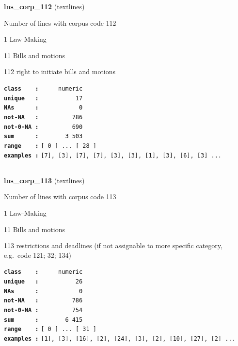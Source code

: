\documentclass[]{article}
\begin{document}
\textbf{lns\_corp\_112} (textlines)

Number of lines with corpus code 112

1 Law-Making

11 Bills and motions

112 right to initiate bills and motions

\textbf{\texttt{class\ \ \ \ :}} \texttt{~~~~~numeric}\\
\textbf{\texttt{unique\ \ \ :}} \texttt{~~~~~~~~~~17}\\
\textbf{\texttt{NAs\ \ \ \ \ \ :}} \texttt{~~~~~~~~~~~0}\\
\textbf{\texttt{not-NA\ \ \ :}} \texttt{~~~~~~~~~786}\\
\textbf{\texttt{not-0-NA\ :}} \texttt{~~~~~~~~~690}\\
\textbf{\texttt{sum\ \ \ \ \ \ :}} \texttt{~~~~~~~3~503}\\
\textbf{\texttt{range\ \ \ \ :}}
\texttt{{[}\ 0\ {]}\ ...\ {[}\ 28\ {]}}\\
\textbf{\texttt{examples\ :}}
\texttt{{[}7{]},\ {[}3{]},\ {[}7{]},\ {[}7{]},\ {[}3{]},\ {[}3{]},\ {[}1{]},\ {[}3{]},\ {[}6{]},\ {[}3{]}\ ...}\\

~

\textbf{lns\_corp\_113} (textlines)

Number of lines with corpus code 113

1 Law-Making

11 Bills and motions

113 restrictions and deadlines (if not assignable to more specific
category, e.g.~code 121; 32; 134)

\textbf{\texttt{class\ \ \ \ :}} \texttt{~~~~~numeric}\\
\textbf{\texttt{unique\ \ \ :}} \texttt{~~~~~~~~~~26}\\
\textbf{\texttt{NAs\ \ \ \ \ \ :}} \texttt{~~~~~~~~~~~0}\\
\textbf{\texttt{not-NA\ \ \ :}} \texttt{~~~~~~~~~786}\\
\textbf{\texttt{not-0-NA\ :}} \texttt{~~~~~~~~~754}\\
\textbf{\texttt{sum\ \ \ \ \ \ :}} \texttt{~~~~~~~6~415}\\
\textbf{\texttt{range\ \ \ \ :}}
\texttt{{[}\ 0\ {]}\ ...\ {[}\ 31\ {]}}\\
\textbf{\texttt{examples\ :}}
\texttt{{[}1{]},\ {[}3{]},\ {[}16{]},\ {[}2{]},\ {[}24{]},\ {[}3{]},\ {[}2{]},\ {[}10{]},\ {[}27{]},\ {[}2{]}\ ...}\\
\end{document}
